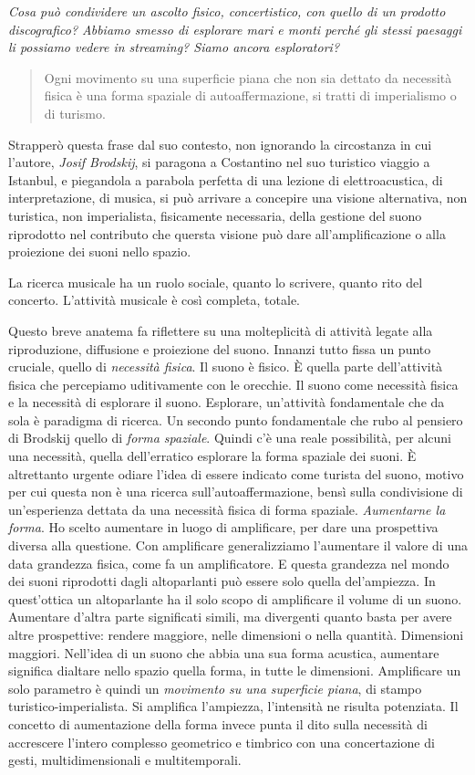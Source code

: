 \documentclass[a4paper,11pt]{article}
\begin{document}
\emph{Cosa può condividere un ascolto fisico, concertistico, con quello di un
prodotto discografico? Abbiamo smesso di esplorare mari e monti perché
gli stessi paesaggi li possiamo vedere in streaming? Siamo ancora
esploratori?}

\begin{quote}
Ogni movimento su una superficie piana che non sia dettato da
necessità fisica è una forma spaziale di autoaffermazione, si tratti
di imperialismo o di turismo.
\end{quote}

Strapperò questa frase dal suo contesto, non ignorando la circostanza in
cui l'autore, \emph{Josif Brodskij}, si paragona a Costantino nel suo
turistico viaggio a Istanbul, e piegandola a parabola perfetta di una
lezione di elettroacustica, di interpretazione, di musica, si può
arrivare a concepire una visione alternativa, non turistica, non
imperialista, fisicamente necessaria, della gestione del suono
riprodotto nel contributo che quersta visione può dare
all'amplificazione o alla proiezione dei suoni nello spazio.

La ricerca musicale ha un ruolo sociale, quanto lo scrivere, quanto rito
del concerto. L'attività musicale è così completa, totale.

Questo breve anatema fa riflettere su una molteplicità di attività
legate alla riproduzione, diffusione e proiezione del suono. Innanzi
tutto fissa un punto cruciale, quello di \emph{necessità fisica}. Il suono è
fisico. È quella parte dell'attività fisica che percepiamo uditivamente
con le orecchie. Il suono come necessità fisica e la necessità di
esplorare il suono. Esplorare, un'attività fondamentale che da sola è
paradigma di ricerca. Un secondo punto fondamentale che rubo al pensiero
di Brodskij quello di \emph{forma spaziale}. Quindi c'è una reale
possibilità, per alcuni una necessità, quella dell'erratico esplorare la
forma spaziale dei suoni. È altrettanto urgente odiare l'idea di essere
indicato come turista del suono, motivo per cui questa non è una ricerca
sull'autoaffermazione, bensì sulla condivisione di un'esperienza dettata
da una necessità fisica di forma spaziale. \emph{Aumentarne la forma}. Ho
scelto aumentare in luogo di amplificare, per dare una prospettiva
diversa alla questione. Con amplificare generalizziamo l'aumentare il
valore di una data grandezza fisica, come fa un amplificatore. E questa
grandezza nel mondo dei suoni riprodotti dagli altoparlanti può essere
solo quella del'ampiezza. In quest'ottica un altoparlante ha il solo
scopo di amplificare il volume di un suono. Aumentare d'altra parte
significati simili, ma divergenti quanto basta per avere altre
prospettive: rendere maggiore, nelle dimensioni o nella quantità.
Dimensioni maggiori. Nell'idea di un suono che abbia una sua forma
acustica, aumentare significa dialtare nello spazio quella forma, in
tutte le dimensioni. Amplificare un solo parametro è quindi un
\emph{movimento su una superficie piana}, di stampo turistico-imperialista.
Si amplifica l'ampiezza, l'intensità ne risulta potenziata. Il concetto
di aumentazione della forma invece punta il dito sulla necessità di
accrescere l'intero complesso geometrico e timbrico con una
concertazione di gesti, multidimensionali e multitemporali.
\end{document}
